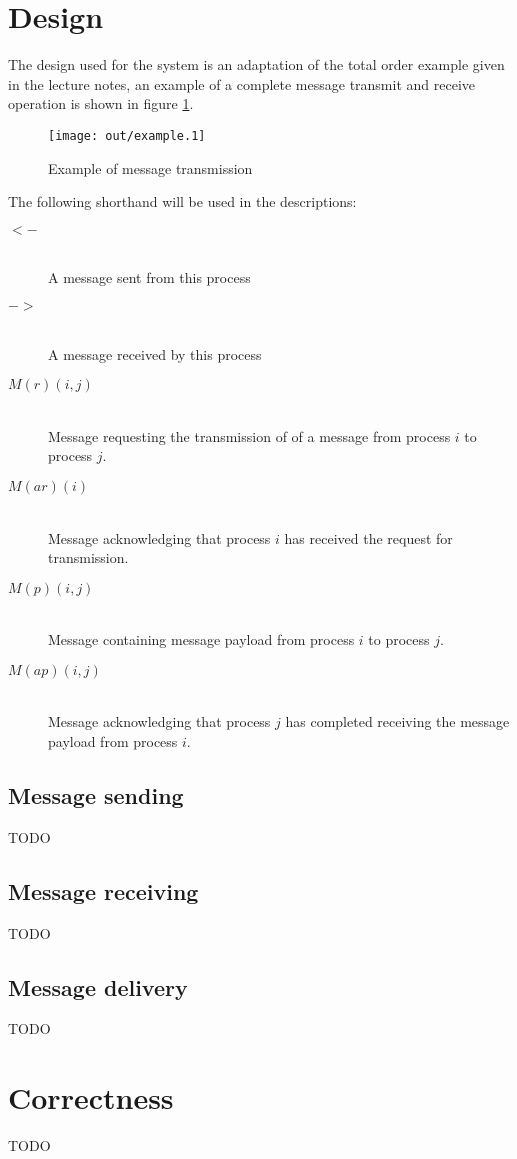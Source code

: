 \documentclass[twocolumn]{article}
\title{\DOCTITLE}
\author{\DOCAUTHOR}
\date{\DOCDATE}
\begin{document}
\section{Design}

The design used for the system is an adaptation of the total order example given
in the lecture notes, an example of a complete message transmit and receive
operation is shown in figure \ref{fig:example}.

\begin{figure}[h!]
  \centering
  \texttt{[image: out/example.1]}
  \caption{Example of message transmission}
  \label{fig:example}
\end{figure}

The following shorthand will be used in the descriptions:

\begin{description}
  \item[$<-$] \hfill \\
    A message sent from this process
  \item[$->$] \hfill \\
    A message received by this process
  \item[$M(r)(i,j)$] \hfill \\
    Message requesting the transmission of of a message from process $i$ to
    process $j$.
  \item[$M(ar)(i)$] \hfill \\
    Message acknowledging that process $i$ has received the request for
    transmission.
  \item[$M(p)(i,j)$] \hfill \\
    Message containing message payload from process $i$ to process $j$.
  \item[$M(ap)(i,j)$] \hfill \\
    Message acknowledging that process $j$ has completed receiving the message
    payload from process $i$.
\end{description}

\subsection{Message sending}

TODO

\subsection{Message receiving}

TODO

\subsection{Message delivery}

TODO

\section{Correctness}

TODO
\end{document}
